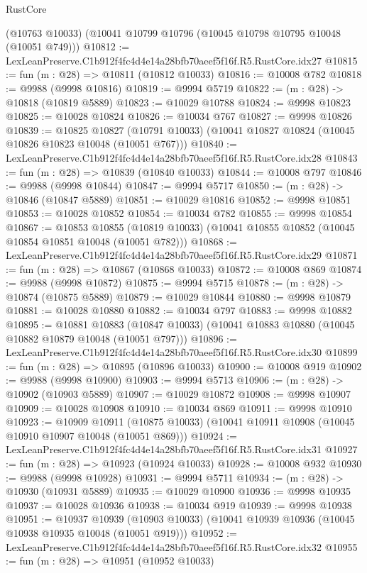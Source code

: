 \begin{lexlean}{RustCore}
\begin{coremodule}
    (@10763 @10033)
    (@10041 @10799 @10796 (@10045 @10798 @10795 @10048 (@10051 @749)))
@10812 := LexLeanPreserve.C1b912f4fc4d4e14a28bfb70aeef5f16f.R5.RustCore.idx27
@10815 := fun (m : @28) => @10811 (@10812 @10033)
@10816 := @10008 @782
@10818 := @9988 (@9998 @10816)
@10819 := @9994 @5719
@10822 := (m : @28) -> @10818 (@10819 @5889)
@10823 := @10029 @10788
@10824 := @9998 @10823
@10825 := @10028 @10824
@10826 := @10034 @767
@10827 := @9998 @10826
@10839 := @10825
    @10827
    (@10791 @10033)
    (@10041 @10827 @10824 (@10045 @10826 @10823 @10048 (@10051 @767)))
@10840 := LexLeanPreserve.C1b912f4fc4d4e14a28bfb70aeef5f16f.R5.RustCore.idx28
@10843 := fun (m : @28) => @10839 (@10840 @10033)
@10844 := @10008 @797
@10846 := @9988 (@9998 @10844)
@10847 := @9994 @5717
@10850 := (m : @28) -> @10846 (@10847 @5889)
@10851 := @10029 @10816
@10852 := @9998 @10851
@10853 := @10028 @10852
@10854 := @10034 @782
@10855 := @9998 @10854
@10867 := @10853
    @10855
    (@10819 @10033)
    (@10041 @10855 @10852 (@10045 @10854 @10851 @10048 (@10051 @782)))
@10868 := LexLeanPreserve.C1b912f4fc4d4e14a28bfb70aeef5f16f.R5.RustCore.idx29
@10871 := fun (m : @28) => @10867 (@10868 @10033)
@10872 := @10008 @869
@10874 := @9988 (@9998 @10872)
@10875 := @9994 @5715
@10878 := (m : @28) -> @10874 (@10875 @5889)
@10879 := @10029 @10844
@10880 := @9998 @10879
@10881 := @10028 @10880
@10882 := @10034 @797
@10883 := @9998 @10882
@10895 := @10881
    @10883
    (@10847 @10033)
    (@10041 @10883 @10880 (@10045 @10882 @10879 @10048 (@10051 @797)))
@10896 := LexLeanPreserve.C1b912f4fc4d4e14a28bfb70aeef5f16f.R5.RustCore.idx30
@10899 := fun (m : @28) => @10895 (@10896 @10033)
@10900 := @10008 @919
@10902 := @9988 (@9998 @10900)
@10903 := @9994 @5713
@10906 := (m : @28) -> @10902 (@10903 @5889)
@10907 := @10029 @10872
@10908 := @9998 @10907
@10909 := @10028 @10908
@10910 := @10034 @869
@10911 := @9998 @10910
@10923 := @10909
    @10911
    (@10875 @10033)
    (@10041 @10911 @10908 (@10045 @10910 @10907 @10048 (@10051 @869)))
@10924 := LexLeanPreserve.C1b912f4fc4d4e14a28bfb70aeef5f16f.R5.RustCore.idx31
@10927 := fun (m : @28) => @10923 (@10924 @10033)
@10928 := @10008 @932
@10930 := @9988 (@9998 @10928)
@10931 := @9994 @5711
@10934 := (m : @28) -> @10930 (@10931 @5889)
@10935 := @10029 @10900
@10936 := @9998 @10935
@10937 := @10028 @10936
@10938 := @10034 @919
@10939 := @9998 @10938
@10951 := @10937
    @10939
    (@10903 @10033)
    (@10041 @10939 @10936 (@10045 @10938 @10935 @10048 (@10051 @919)))
@10952 := LexLeanPreserve.C1b912f4fc4d4e14a28bfb70aeef5f16f.R5.RustCore.idx32
@10955 := fun (m : @28) => @10951 (@10952 @10033)

\end{coremodule}
\end{lexlean}
